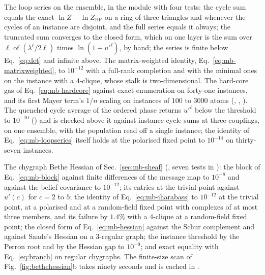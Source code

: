 The loop series on the ensemble, in the module  with
four tests: the cycle
sum equals the exact $\ln Z-\ln Z_{\mathrm{BP}}$ on a ring of three
triangles and whenever the cycles of an instance are disjoint, and the full
series equals it always; the truncated sum converges to the closed form,
which on one layer is the sum over $\ell$ of $(\lambda^{\ell}/2\ell)$ times
$\ln(1+u'^{\ell})$, by hand; the series is finite below Eq.~\eqref{eq:det} and infinite above.
The matrix-weighted identity, Eq.~\eqref{eq:mb-matrixweighted}, to
$10^{-12}$ with a full-rank completion and with the minimal ones on the
instance with a $4$-clique, whose stalk is two-dimensional. The hard-core
gas of Eq.~\eqref{eq:mb-hardcore} against exact enumeration on forty-one
instances, and its first Mayer term's $1/n$ scaling on instances of $100$
to $3000$ atoms (, ,
). The
quenched cycle average of the ordered phase returns $u'^{\ell}$ below the
threshold to $10^{-10}$ () and is
checked above it against instance cycle sums at three couplings, on one
ensemble, with the population read off a single instance; the identity
of Eq.~\eqref{eq:mb-loopseries} itself holds at the polarised fixed
point to $10^{-14}$ on thirty-seven instances.

The chygraph Bethe Hessian of Sec.~\ref{sec:mb-sheaf}
(, seven tests in ): the block of Eq.~\eqref{eq:mb-block} against
finite differences of the message map to $10^{-8}$ and against the
belief covariance to $10^{-12}$; its entries at the trivial point against
$u'(c)$ for $c=2$ to $5$; the identity of Eq.~\eqref{eq:mb-iharabass} to
$10^{-12}$ at the trivial point, at a polarised and at a random-field
fixed point with complexes of at most three members, and its failure by
$1.4\%$ with a $4$-clique at a random-field fixed point; the closed form
of Eq.~\eqref{eq:mb-hessian} against the Schur complement and against
Saade's Hessian on a $3$-regular graph; the instance threshold by the
Perron root and by the Hessian gap to $10^{-9}$; and exact equality with
Eq.~\eqref{eq:branch} on regular chygraphs. The finite-size scan of
Fig.~\ref{fig:bethehessian}b takes ninety seconds and is cached in
.

